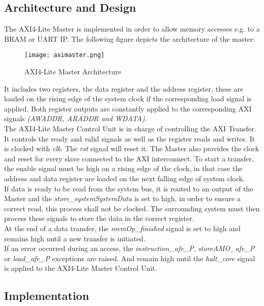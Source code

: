 \subsection{Architecture and Design}
The AXI4-Lite Master is implemented in order to allow memory accesses e.g. to a
BRAM or UART IP. The following figure depicts the architecture of the master:
\begin{figure}[H]
	\centering
	\texttt{[image: aximaster.png]}
	\caption{AXI4-Lite Master Architecture}
	\label{fig:aximaster}
\end{figure}
It includes two registers, the data register and the address register, these are loaded on the rising edge of the system clock if the corresponding load signal is applied. Both register outputs are constantly applied to the corresponding AXI signals \textit{(AWADDR, ARADDR and WDATA)}.\\
The AXI4-Lite Master Control Unit is in charge of controlling the AXI Transfer. It
controls the ready and valid signals as well as the register reads and writes. It is
clocked with \textit{clk}. The \textit{rst} signal will reset it. The Master also provides the clock and reset for every slave connected to the AXI interconnect. To start a transfer, the enable signal must be high on a rising edge of the clock, in that case the address and data register are loaded on the next falling edge of system clock.\\
If data is ready to be read from the system bus, it is routed to an output of the Master and the \textit{store\_systemSystemData} is set to high, in order to ensure a correct read, this process shall not be clocked. The surrounding system must then process these signals to store the data in the correct register.\\
At the end of a data transfer, the \textit{memOp\_finished} signal is set to high and remains high until a new transfer is initiated.\\
If an error occurred during an access, the \textit{instruction\_afe\_P}, \textit{storeAMO\_afe\_P} or \textit{load\_afe\_P} exceptions are raised. And remain high until the \textit{halt\_core} signal is applied to the AXI4-Lite Master Control Unit.
\subsection{Implementation}

